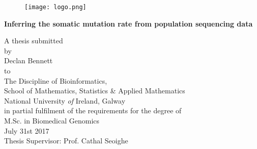 \documentclass[a4paper, 12pt]{report}
\begin{document}
\begin{titlepage}
\setlength{\topmargin}{-0.6in}

\begin{figure}[!h]
  \centering
\texttt{[image: logo.png]}
\end{figure}
\vspace{1cm}

\begin{center}
{\LARGE \bigskip\textbf{Inferring the somatic mutation rate from population sequencing data}}

\vspace{1.25cm}
{\normalsize A thesis submitted \vspace{.5cm}\\ by \vspace{.5cm}\\
\vspace{1.25cm} Declan Bennett \vspace{1.25cm} \\ to \vspace{.5cm} \\
The Discipline of Bioinformatics, \\ School of Mathematics, Statistics \& Applied Mathematics \\ National University \textit{of} Ireland, Galway \vspace{1cm} \\ in partial fulfilment of
the requirements for the degree of \\ \vspace{.5cm} M.Sc. in
Biomedical Genomics \vspace{1cm} \\ July 31st 2017 \\
\vspace{1.25cm} Thesis Supervisor: Prof. Cathal Seoighe}

\end{center}
\end{titlepage}



 \setcounter{page}{2}
\tableofcontents
\newpage
\listoffigures
\listoftables










\end{document}
